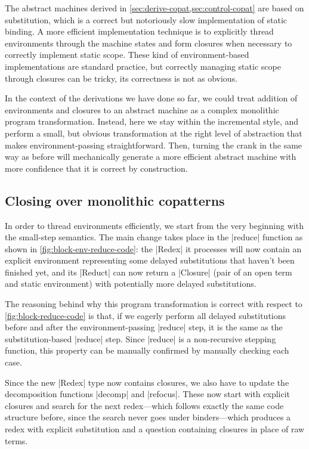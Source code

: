 The abstract machines derived in \cref{sec:derive-copat,sec:control-copat} are
based on substitution, which is a correct but notoriously slow implementation of
static binding.  A more efficient implementation technique is to explicitly
thread environments through the machine states and form closures when necessary
to correctly implement static scope.  These kind of environment-based
implementations are standard practice, but correctly managing static scope
through closures can be tricky, its correctness is not as obvious.

In the context of the derivations we have done so far, we could treat addition
of environments and closures to an abstract machine as a complex monolithic
program transformation.  Instead, here we stay within the incremental style, and
perform a small, but obvious transformation at the right level of abstraction
that makes environment-passing straightforward.  Then, turning the crank in the
same way as before will mechanically generate a more efficient abstract machine
with more confidence that it is correct by construction.

\subsection{Closing over monolithic copatterns}
\label{sec:closing-monolithic-copat}

In order to thread environments efficiently, we start from the very beginning
with the small-step semantics.  The main change takes place in the \hs|reduce|
function as shown in \cref{fig:block-env-reduce-code}: the \hs|Redex| it
processes will now contain an explicit environment representing some delayed
substitutions that haven't been finished yet, and its \hs|Reduct| can now return
a \hs|Closure| (pair of an open term and static environment) with potentially
more delayed substitutions.

The reasoning behind why this program transformation is correct with respect to
\cref{fig:block-reduce-code} is that, if we eagerly perform all delayed
substitutions before and after the environment-passing \hs|reduce| step, it is
the same as the substitution-based \hs|reduce| step.  Since \hs|reduce| is a
non-recursive stepping function, this property can be manually confirmed by
manually checking each case.

Since the new \hs|Redex| type now contains closures, we also have to update the
decomposition functions \hs|decomp| and \hs|refocus|.  These now start with
explicit closures and search for the next redex---which follows exactly the
same code structure before, since the search never goes under binders---which
produces a redex with explicit substitution and a question containing closures in
place of raw terms.

